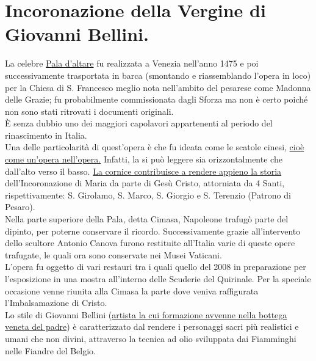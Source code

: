 \documentclass[12pt,a4paper]{article}
\begin{document}
	\section{Incoronazione della Vergine di Giovanni Bellini.}
	La celebre \underline{Pala d'altare} fu realizzata a Venezia nell'anno 1475 e poi successivamente trasportata in barca (smontando e riassemblando l'opera in loco) per la Chiesa di S. Francesco meglio nota nell'ambito del pesarese come Madonna delle Grazie; fu probabilmente commissionata dagli Sforza ma non è certo poiché non sono stati ritrovati i documenti originali.\\
	È senza dubbio uno dei maggiori capolavori appartenenti al periodo del rinascimento in Italia.\\
	Una delle particolarità di quest'opera è che fu ideata come le scatole cinesi, \underline{cioè come un’opera nell'opera.} Infatti, la si può leggere sia orizzontalmente che dall'alto verso il basso. \underline{La cornice contribuisce a rendere appieno la storia} dell'Incoronazione di Maria da parte di Gesù Cristo, attorniata da 4 Santi, rispettivamente: S. Girolamo, S. Marco, S. Giorgio e S. Terenzio (Patrono di Pesaro). \\
	Nella parte superiore della Pala, detta Cimasa, Napoleone trafugò parte del dipinto, per poterne conservare il ricordo. Successivamente grazie all'intervento dello scultore Antonio Canova furono restituite all'Italia varie di queste opere trafugate, le quali ora sono conservate nei Musei Vaticani.\\
	L'opera fu oggetto di vari restauri tra i quali quello del 2008 in preparazione per l'esposizione in una mostra all'interno delle Scuderie del Quirinale. Per la speciale occasione venne riunita alla Cimasa la parte dove veniva raffigurata l’Imbalsamazione di Cristo.\\
	Lo stile di Giovanni Bellini (\underline{artista la cui formazione avvenne nella bottega veneta del padre})  è caratterizzato dal rendere i personaggi sacri più realistici e umani che non divini, attraverso la tecnica ad olio sviluppata dai Fiamminghi nelle Fiandre del Belgio.
	
\end{document}
